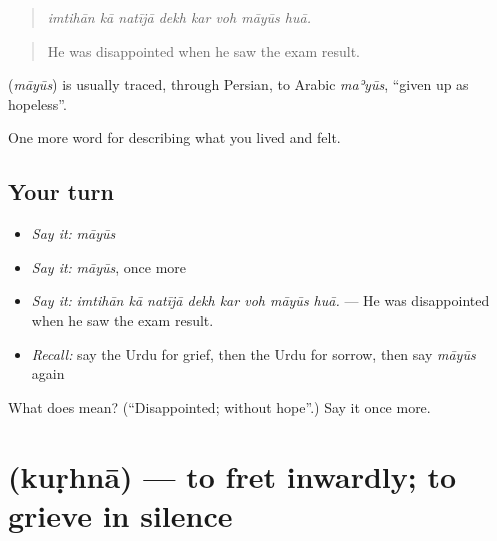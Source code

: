 \begin{quote}
       
\end{quote}

\begin{quote}
\emph{imtihān kā natījā dekh kar voh māyūs huā.}
\end{quote}

\begin{quote}
He was disappointed when he saw the exam result.
\end{quote}

\begin{cousinweb}
\textbf{} (\emph{māyūs}) is usually traced, through Persian, to Arabic \emph{maʾyūs}, \textquotedblleft{}given up as hopeless\textquotedblright{}.
\end{cousinweb}

\begin{grammarlens}[title={What you've built}]
One more word for describing what you lived and felt.
\end{grammarlens}

\subsection*{Your turn}
\begin{itemize}
\raggedright
  \item \emph{Say it:} \emph{māyūs}
  \item \emph{Say it:} \emph{māyūs}, once more
  \item \emph{Say it:} \emph{imtihān kā natījā dekh kar voh māyūs huā.} — He was disappointed when he saw the exam result.
  \item \emph{Recall:} say the Urdu for grief, then the Urdu for sorrow, then say \emph{māyūs} again
\end{itemize}

\begin{tcolorbox}[breakable,colback=teal!4,colframe=teal!35!black,title={Before you move on}]
What does  mean? (\textquotedblleft{}Disappointed; without hope\textquotedblright{}.) Say it once more.
\end{tcolorbox}
\section[\texorpdfstring{\ur{کڑھنا} (kuṛhnā)}{کڑھنا (kuṛhnā)}]{ (kuṛhnā) — to fret inwardly; to grieve in silence}

